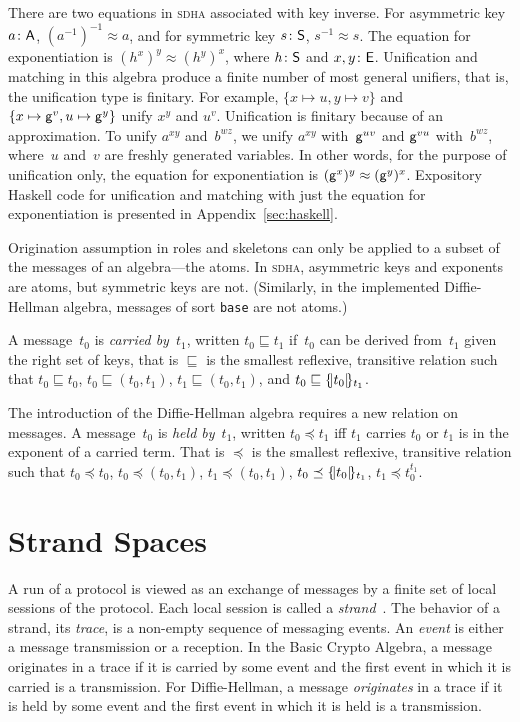 \documentclass[12pt]{article}
\newcommand{\sdha}{\textsc{sdha}}
\newcommand{\gen}{\ensuremath{\cn{g}}}
\begin{document}
There are two equations in {\sdha} associated with key inverse.  For
asymmetric key $a\colon\mathsf{A}$, $(a^{-1})^{-1}\approx a$, and for
symmetric key $s\colon\mathsf{S}$, $s^{-1}\approx s$.  The equation for
exponentiation is $(h^x)^y\approx (h^y)^x$, where $h\colon\mathsf{S}$ and
$x,y\colon\mathsf{E}$.  Unification and matching in this algebra produce a
finite number of most general unifiers, that is, the unification type
is finitary.  For example, $\{x\mapsto u,y\mapsto v\}$ and $\{x\mapsto
\gen^v,u\mapsto \gen^y\}$ unify $x^y$ and $u^v$.  Unification is
finitary because of an approximation.  To unify $a^{xy}$ and~$b^{wz}$,
we unify $a^{xy}$ with~$\gen^{uv}$ and $\gen^{vu}$ with~$b^{wz}$,
where~$u$ and~$v$ are freshly generated variables.  In other words,
for the purpose of unification only, the equation for exponentiation
is $(\gen^x)^y\approx (\gen^y)^x$.  Expository Haskell code for
unification and matching with just the equation for exponentiation is
presented in Appendix~\ref{sec:haskell}.

Origination assumption in roles and skeletons can only be applied to a
subset of the messages of an algebra---the atoms.  In {\sdha},
asymmetric keys and exponents are atoms, but symmetric keys are not.
(Similarly, in the implemented Diffie-Hellman algebra, messages of
sort \texttt{base} are not atoms.)

A message~$t_0$ is \emph{carried by}~$t_1$, written $t_0\sqsubseteq
t_1$ if~$t_0$ can be derived from~$t_1$ given the right set of keys,
that is $\sqsubseteq$ is the smallest reflexive, transitive relation
such that $t_0\sqsubseteq t_0$, $t_0\sqsubseteq (t_0, t_1)$,
$t_1\sqsubseteq (t_0, t_1)$, and $t_0\sqsubseteq\{\!|t_0|\!\}_{t_1}$.

The introduction of the Diffie-Hellman algebra requires a new relation
on messages.  A message~$t_0$ is \emph{held by}~$t_1$, written
$t_0\preceq t_1$ iff $t_1$ carries $t_0$ or $t_1$ is in the exponent
of a carried term.  That is $\preceq$ is the smallest reflexive,
transitive relation such that $t_0\preceq t_0$, $t_0\preceq (t_0,
t_1)$, $t_1\preceq (t_0, t_1)$, $t_0\preceq\{\!|t_0|\!\}_{t_1}$,
$t_1\preceq t_0^{t_1}$.

\section{Strand Spaces}\label{sec:strand spaces}

A run of a protocol is viewed as an exchange of messages by a finite
set of local sessions of the protocol.  Each local session is called a
\emph{strand}~\cite{ThayerEtal99}.  The behavior of a strand, its
\emph{trace}, is a non-empty sequence of messaging events.  An
\emph{event} is either a message transmission or a reception.  In the
Basic Crypto Algebra, a message originates in a trace if it is carried
by some event and the first event in which it is carried is a
transmission.  For Diffie-Hellman, a message \emph{originates} in a
trace if it is held by some event and the first event in which it is
held is a transmission.
\end{document}

